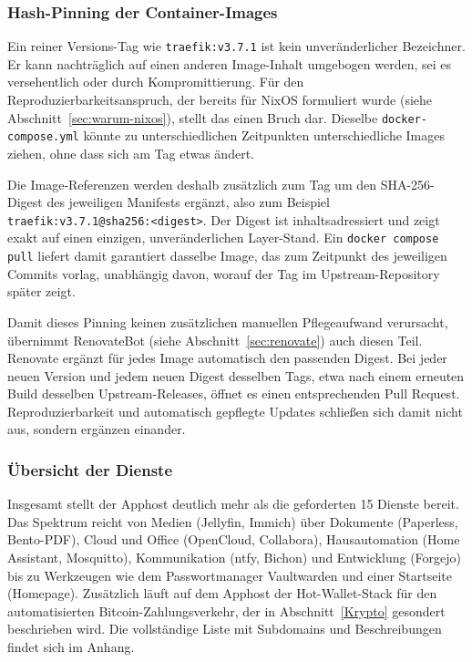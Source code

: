 \subsubsection{Hash-Pinning der Container-Images}
\label{sec:apphost-digest-pinning}

Ein reiner Versions-Tag wie \texttt{traefik:v3.7.1} ist kein unveränderlicher
Bezeichner. Er kann nachträglich auf einen anderen Image-Inhalt umgebogen
werden, sei es versehentlich oder durch Kompromittierung. Für den
Reproduzierbarkeitsanspruch, der bereits für NixOS formuliert wurde
(siehe Abschnitt~\ref{sec:warum-nixos}), stellt das einen Bruch dar. Dieselbe
\texttt{docker-compose.yml} könnte zu unterschiedlichen Zeitpunkten
unterschiedliche Images ziehen, ohne dass sich am Tag etwas ändert.

Die Image-Referenzen werden deshalb zusätzlich zum Tag um den SHA-256-Digest
des jeweiligen Manifests ergänzt, also zum Beispiel
\texttt{traefik:v3.7.1@sha256:<digest>}. Der Digest ist inhaltsadressiert und
zeigt exakt auf einen einzigen, unveränderlichen Layer-Stand. Ein
\texttt{docker compose pull} liefert damit garantiert dasselbe Image, das zum
Zeitpunkt des jeweiligen Commits vorlag, unabhängig davon, worauf der Tag im
Upstream-Repository später zeigt.

Damit dieses Pinning keinen zusätzlichen manuellen Pflegeaufwand verursacht,
übernimmt RenovateBot (siehe Abschnitt~\ref{sec:renovate}) auch diesen Teil.
Renovate ergänzt für jedes Image automatisch den passenden Digest. Bei jeder
neuen Version und jedem neuen Digest desselben Tags, etwa nach einem erneuten
Build desselben Upstream-Releases, öffnet es einen entsprechenden Pull
Request. Reproduzierbarkeit und automatisch gepflegte Updates schließen sich
damit nicht aus, sondern ergänzen einander.


\subsubsection{Übersicht der Dienste}

Insgesamt stellt der Apphost deutlich mehr als die geforderten 15 Dienste
bereit. Das Spektrum reicht von Medien (Jellyfin, Immich) über Dokumente
(Paperless, Bento-\ac{PDF}), Cloud und Office (OpenCloud, Collabora),
Hausautomation (Home Assistant, Mosquitto), Kommunikation (ntfy, Bichon) und
Entwicklung (Forgejo) bis zu Werkzeugen wie dem Passwortmanager Vaultwarden
und einer Startseite (Homepage). Zusätzlich läuft auf dem Apphost der
Hot-Wallet-Stack für den automatisierten Bitcoin-Zahlungsverkehr, der in
Abschnitt~\ref{Krypto} gesondert beschrieben wird. Die vollständige Liste mit
Subdomains und Beschreibungen findet sich im Anhang.

